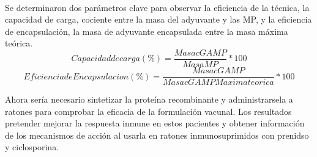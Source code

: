 \documentclass[a4paper,11pt]{article}
\begin{document}
\\Se determinaron dos parámetros clave para observar la eficiencia de la técnica, la capacidad de carga, cociente entre la masa del adyuvante y las MP, y la eficiencia de encapsulación, la masa de adyuvante encapsulada entre la masa máxima teórica.
\begin{displaymath}
	Capacidad de carga(\%) =  \frac{Masa cGAMP}{Masa MP} * 100
\end{displaymath}
\begin{displaymath}
	Eficiencia de Encapsulacion (\%) = \frac{Masa cGAMP}{Masa cGAMP Maxima  teorica} * 100
\end{displaymath}

Ahora sería necesario sintetizar la proteína recombinante y administrarsela a ratones para comprobar la eficacia de la formulación vacunal\cite{HA}. Los resultados pretender mejorar la respuesta inmune en estos pacientes y obtener información de los mecanismos de acción al usarla en ratones inmunosuprimidos con prenidso y ciclosporina. 



	
\end{document}
